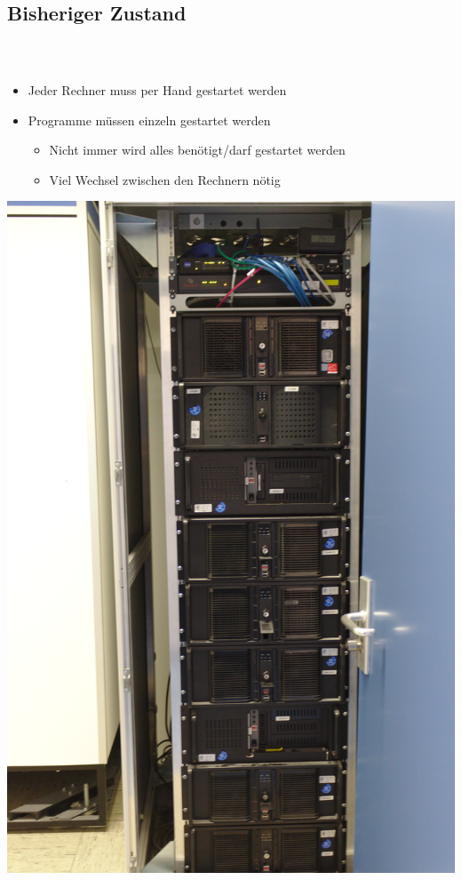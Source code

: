 \documentclass[accentcolor=tud1b,colorbacktitle,landscape,german,presentation]{tudbeamer}
\newcommand{\ftitle}{
	\frametitle{\insertsectionhead \\ {\small \insertsubsectionhead}}
}
\begin{document}
\subsection{Bisheriger Zustand}
\begin{frame}
	\ftitle
	\begin{overlayarea}{\textwidth}{.5\hsize}
	\begin{minipage}[t]{.7\textwidth}
	\begin{itemize}
		\item Jeder Rechner muss per Hand gestartet werden\pause
		\item Programme müssen einzeln gestartet werden\pause
			\begin{itemize}
				\item Nicht immer wird alles benötigt/darf gestartet werden\pause
				\item Viel Wechsel zwischen den Rechnern nötig
			\end{itemize}
	\end{itemize}
	\end{minipage}
	\begin{minipage}[t]{.2\textwidth}
		\includegraphics[scale=0.55]{server-small}
	\end{minipage}

	\end{overlayarea}
\end{frame}
\end{document}
